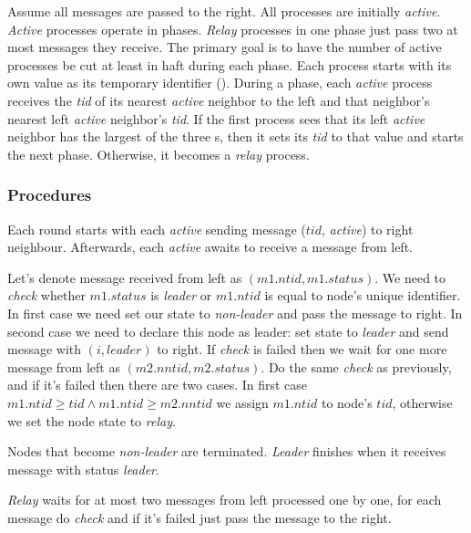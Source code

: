 \documentclass{article}
\begin{document}
Assume all messages are passed to the right. All processes are initially \textit{active}. \textit{Active} processes operate in phases. \textit{Relay} processes in one phase just pass two at most messages they receive. The primary goal is to have the number of active processes be cut at least in haft during each phase. Each process starts with its own value as its temporary identifier (). During a phase, each \textit{active} process receives the \textit{tid} of its nearest \textit{active} neighbor to the left and that neighbor's nearest left \textit{active} neighbor's \textit{tid}. If the first process sees that its left \textit{active} neighbor has the largest of the three s, then it sets its \textit{tid} to that value and starts the next phase. Otherwise, it becomes a \textit{relay} process.

\subsubsection*{Procedures}

Each round starts with each \textit{active} sending message ($tid$, \textit{active}) to right neighbour. Afterwards, each \textit{active} awaits to receive a message from left.

Let's denote message received from left as $(m1.ntid, m1.status)$. We need to \textit{check} whether $m1.status$ is \textit{leader} or $m1.ntid$ is equal to node's unique identifier. In first case we need set our state to \textit{non-leader} and pass the message to right. In second case we need to declare this node as leader: set state to \textit{leader} and send message with $(i, \textit{leader})$ to right. If \textit{check} is failed then we wait for one more message from left as $(m2.nntid, m2.status)$. Do the same \textit{check} as previously, and if it's failed then there are two cases. In first case $m1.ntid \geq tid \land m1.ntid \geq m2.nntid$ we assign $m1.ntid$ to node's $tid$, otherwise we set the node state to \textit{relay}.

Nodes that become \textit{non-leader} are terminated. \textit{Leader} finishes when it receives message with status \textit{leader}.

\textit{Relay} waits for at most two messages from left processed one by one, for each message do \textit{check} and if it's failed just pass the message to the right.
\end{document}
